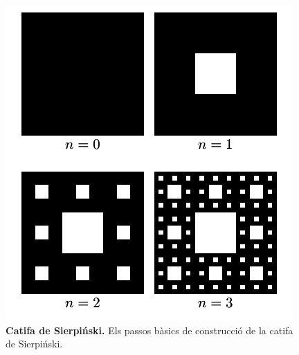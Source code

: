 \documentclass[12pt,a4paper]{report}
\begin{document}
\begin{figure}[!ht]
\centering
\includegraphics[scale=1]{img/img03_12_sierpinskiCarpet.pdf} 
\caption{\textbf{Catifa de Sierpiński.} Els passos bàsics de construcció de la catifa de Sierpiński.}
\end{figure}
\end{document}
